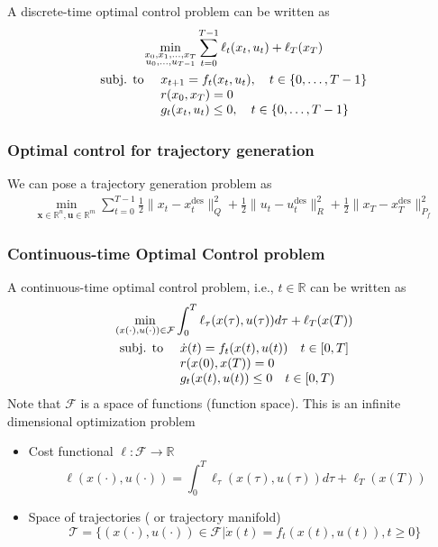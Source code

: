 \documentclass{book}
\DeclareMathOperator{\des}{des}
\newcommand{\R}{\mathbb{R}}
\begin{document}
A discrete-time optimal control problem can be written as 
\begin{gather*}
    \min_{\substack{x_0,x_1,\dots,x_T\\u_0,\dots,u_{T-1}}} \displaystyle\sum_{t=0}^{T-1}\ell_t(x_t,u_t)+\ell_T(x_T)\\
    \begin{array}{l l }
        \text{subj. to } & x_{t+1}=f_t(x_t,u_t), \quad t\in\{0,\dots,T-1\}\\
                         & r(x_0,x_T) = 0  \\
                         & g_t(x_t,u_t)\leq 0, \quad t\in\{0,\dots,T-1\}
    \end{array}
\end{gather*}

\subsubsection{Optimal control for trajectory generation}
We can pose a trajectory generation problem as 
\begin{gather*}
    \min_{\mathbf{x}\in\R^n,\mathbf{u}\in\R^m}\displaystyle\sum_{t=0}^{T-1}\displaystyle\frac{1}{2}\|x_t-x_t^{\des}\|^2_Q + \displaystyle\frac{1}{2}\|u_t-u_t^{\des}\|^2_R + \displaystyle\frac{1}{2}\|x_T-x_T^{\des}\|^2_{P_f}
\end{gather*}

\subsubsection{Continuous-time Optimal Control problem}
A continuous-time optimal control problem, i.e., $t\in\R$ can be written as 
\begin{gather*}
    \min_{(x(\cdot),u(\cdot))\in \mathcal{F}}\displaystyle\int_{0}^{T}\ell_\tau(x(\tau),u(\tau))d\tau+\ell_T(x(T))\\
    \begin{array}{l l}
        \text{subj. to } & \dot{x}(t) = f_t(x(t),u(t)) \quad t\in[0,T]\\
                         & r(x(0),x(T)) = 0 \\
                         & g_t(x(t),u(t))\leq 0 \quad t\in[0,T)
    \end{array}
\end{gather*}
Note that $\mathcal{F}$ is a space of functions (function space). This is an infinite dimensional optimization problem
\begin{itemize}
    \item Cost functional $\ell:\mathcal{F}\to\R$
        \[
            \ell(x(\cdot),u(\cdot)) = \displaystyle\int_{0}^{T}\ell_\tau(x(\tau),u(\tau))d\tau+\ell_T(x(T))
        \]
    \item Space of trajectories ( or trajectory manifold)
        \[
            \mathcal{T} = \{(x(\cdot),u(\cdot))\in\mathcal{F}|\dot{x}(t)=f_t(x(t),u(t)), t\geq 0\}
        \]
\end{itemize}
\end{document}

